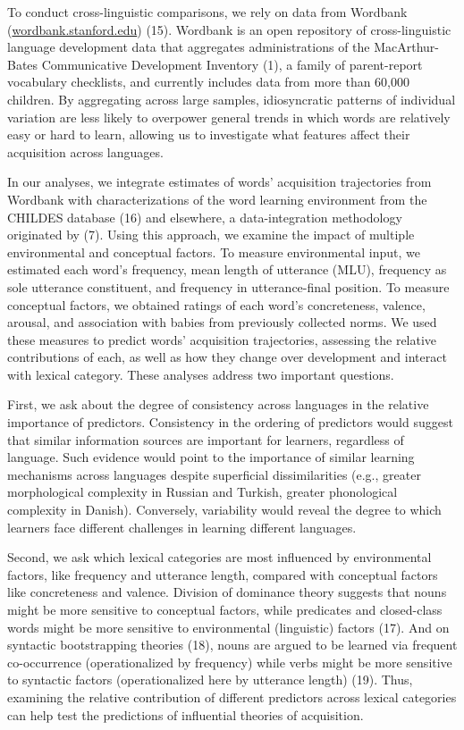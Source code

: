 \documentclass[english,man]{apa6}
\theoremstyle{definition}
\theoremstyle{definition}
\theoremstyle{definition}
\theoremstyle{remark}
\begin{document}
To conduct cross-linguistic comparisons, we rely on data from Wordbank
(\href{http://wordbank.stanford.edu}{wordbank.stanford.edu}) (15).
Wordbank is an open repository of cross-linguistic language development
data that aggregates administrations of the MacArthur-Bates
Communicative Development Inventory (1), a family of parent-report
vocabulary checklists, and currently includes data from more than 60,000
children. By aggregating across large samples, idiosyncratic patterns of
individual variation are less likely to overpower general trends in
which words are relatively easy or hard to learn, allowing us to
investigate what features affect their acquisition across languages.

In our analyses, we integrate estimates of words' acquisition
trajectories from Wordbank with characterizations of the word learning
environment from the CHILDES database (16) and elsewhere, a
data-integration methodology originated by (7). Using this approach, we
examine the impact of multiple environmental and conceptual factors. To
measure environmental input, we estimated each word's frequency, mean
length of utterance (MLU), frequency as sole utterance constituent, and
frequency in utterance-final position. To measure conceptual factors, we
obtained ratings of each word's concreteness, valence, arousal, and
association with babies from previously collected norms. We used these
measures to predict words' acquisition trajectories, assessing the
relative contributions of each, as well as how they change over
development and interact with lexical category. These analyses address
two important questions.

First, we ask about the degree of consistency across languages in the
relative importance of predictors. Consistency in the ordering of
predictors would suggest that similar information sources are important
for learners, regardless of language. Such evidence would point to the
importance of similar learning mechanisms across languages despite
superficial dissimilarities (e.g., greater morphological complexity in
Russian and Turkish, greater phonological complexity in Danish).
Conversely, variability would reveal the degree to which learners face
different challenges in learning different languages.

Second, we ask which lexical categories are most influenced by
environmental factors, like frequency and utterance length, compared
with conceptual factors like concreteness and valence. Division of
dominance theory suggests that nouns might be more sensitive to
conceptual factors, while predicates and closed-class words might be
more sensitive to environmental (linguistic) factors (17). And on
syntactic bootstrapping theories (18), nouns are argued to be learned
via frequent co-occurrence (operationalized by frequency) while verbs
might be more sensitive to syntactic factors (operationalized here by
utterance length) (19). Thus, examining the relative contribution of
different predictors across lexical categories can help test the
predictions of influential theories of acquisition.
\end{document}
